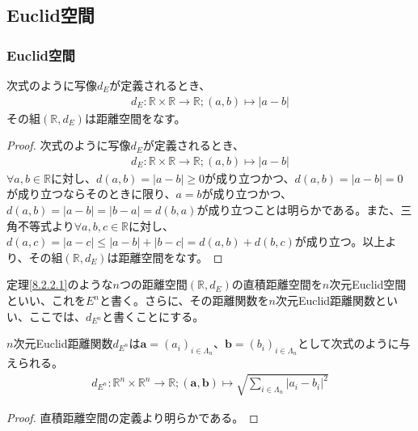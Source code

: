 \documentclass[dvipdfmx]{jsarticle}
\begin{document}
\subsection{Euclid空間}%
\subsubsection{Euclid空間}%
\begin{thm}\label{8.2.2.1} 次式のように写像$d_{E}$が定義されるとき、
\begin{align*}
d_{E}:\mathbb{R} \times \mathbb{R} \rightarrow \mathbb{R};(a,b) \mapsto |a - b|
\end{align*}
その組$\left( \mathbb{R},d_{E} \right)$は距離空間をなす。
\end{thm}
\begin{proof} 次式のように写像$d_{E}$が定義されるとき、
\begin{align*}
d_{E}:\mathbb{R} \times \mathbb{R} \rightarrow \mathbb{R};(a,b) \mapsto |a - b|
\end{align*}
$\forall a,b \in \mathbb{R}$に対し、$d(a,b) = |a - b| \geq 0$が成り立つかつ、$d(a,b) = |a - b| = 0$が成り立つならそのときに限り、$a = b$が成り立つかつ、$d(a,b) = |a - b| = |b - a| = d(b,a)$が成り立つことは明らかである。また、三角不等式より$\forall a,b,c \in \mathbb{R}$に対し、$d(a,c) = |a - c| \leq |a - b| + |b - c| = d(a,b) + d(b,c)$が成り立つ。以上より、その組$\left( \mathbb{R},d_{E} \right)$は距離空間をなす。
\end{proof}
\begin{dfn} 定理\ref{8.2.2.1}のような$n$つの距離空間$\left( \mathbb{R},d_{E} \right)$の直積距離空間を$n$次元Euclid空間といい、これを$E^{n}$と書く。さらに、その距離関数を$n$次元Euclid距離関数といい、ここでは、$d_{E^{n}}$と書くことにする。
\end{dfn}
\begin{thm}\label{8.2.2.2}
$n$次元Euclid距離関数$d_{E^{n}}$は$\mathbf{a} = \left( a_{i} \right)_{i \in \varLambda_{n}}$、$\mathbf{b} = \left( b_{i} \right)_{i \in \varLambda_{n}}$として次式のように与えられる。
\begin{align*}
d_{E^{n}}:\mathbb{R}^{n} \times \mathbb{R}^{n} \rightarrow \mathbb{R};\left( \mathbf{a},\mathbf{b} \right) \mapsto \sqrt{\sum_{i \in \varLambda_{n}} \left| a_{i} - b_{i} \right|^{2}}
\end{align*}
\end{thm}
\begin{proof} 直積距離空間の定義より明らかである。
\end{proof}
\end{document}

